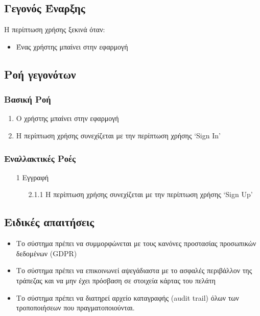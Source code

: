 \documentclass[12pt,a4paper,twoside]{book}
\begin{document}
\subsection{Γεγονός Έναρξης}
Η περίπτωση χρήσης ξεκινά όταν:
\begin{itemize}
  \item Ένας χρήστης μπαίνει στην εφαρμογή
\end{itemize}

\subsection{Ροή γεγονότων}

\subsubsection{Βασική Ροή}
\begin{enumerate}
  \item Ο χρήστης μπαίνει στην εφαρμογή
  \item Η περίπτωση χρήσης συνεχίζεται με την περίπτωση χρήσης `Sign In' %
\end{enumerate}

\subsubsection{Εναλλακτικές Ροές}
\begin{enumerate}
  \item[1 ] Εγγραφή %
        \begin{enumerate}
          \item[2.1.1 ] Η περίπτωση χρήσης συνεχίζεται με την περίπτωση χρήσης `Sign Up' %
        \end{enumerate}
\end{enumerate}

\subsection{Ειδικές απαιτήσεις} %
\begin{itemize}
  \item Το σύστημα πρέπει να συμμορφώνεται με τους κανόνες προστασίας προσωπικών δεδομένων (GDPR)  %
  \item Το σύστημα πρέπει να επικοινωνεί αψεγάδιαστα με το ασφαλές περιβάλλον της τράπεζας και να μην έχει πρόσβαση σε στοιχεία κάρτας του πελάτη   %
  \item Το σύστημα πρέπει να διατηρεί αρχείο καταγραφής (audit trail) όλων των τροποποιήσεων που πραγματοποιούνται. %
\end{itemize}
\end{document}
